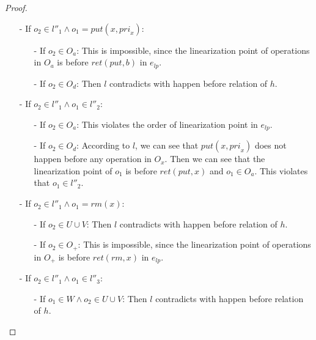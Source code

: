 \begin {proof}
\begin{itemize}
\begin{itemize}
    \item[-] If $o_2 \in O_a \wedge o_1 \in O_d$: Then the order of linearization points of $e_{\textit{lp}}$ contradicts with happen before relation of $h$.
    \end{itemize}

\item[-] If $o_2 \in l''_1 \wedge o_1 = \textit{put}(x,\textit{pri}_x)$:
    \begin{itemize}
    \setlength{\itemsep}{0.5pt}
    \item[-] If $o_2 \in O_a$: This is impossible, since the linearization point of operations in $O_a$ is before $\textit{ret}(\textit{put},b)$ in $e_{\textit{lp}}$.

    \item[-] If $o_2 \in O_d$: Then $l$ contradicts with happen before relation of $h$.
    \end{itemize}

\item[-] If $o_2 \in l''_1 \wedge o_1 \in l''_2$:
    \begin{itemize}
    \setlength{\itemsep}{0.5pt}
    \item[-] If $o_2 \in O_a$: This violates the order of linearization point in $e_{\textit{lp}}$.

    \item[-] If $o_2 \in O_d$: According to $l$, we can see that $\textit{put}(x,\textit{pri}_x)$ does not happen before any operation in $O_x$. Then we can see that the linearization point of $o_1$ is before $\textit{ret}(\textit{put},x)$ and $o_1 \in O_a$. This violates that $o_1 \in l''_2$.
    \end{itemize}

\item[-] If $o_2 \in l''_1 \wedge o_1 = \textit{rm}(x)$:
    \begin{itemize}
    \setlength{\itemsep}{0.5pt}
    \item[-] If $o_2 \in U \cup V$: Then $l$ contradicts with happen before relation of $h$.

    \item[-] If $o_2 \in O_+$: This is impossible, since the linearization point of operations in $O_+$ is before $\textit{ret}(\textit{rm},x)$ in $e_{\textit{lp}}$.
    \end{itemize}

\item[-] If $o_2 \in l''_1 \wedge o_1 \in l''_3$:
    \begin{itemize}
    \setlength{\itemsep}{0.5pt}
    \item[-] If $o_1 \in W \wedge o_2 \in U \cup V$: Then $l$ contradicts with happen before relation of $h$.


\end{itemize}
\end{itemize}
\end{proof}
